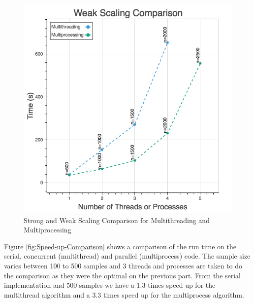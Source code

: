 \documentclass[10pt,twocolumn,letterpaper]{article}
\begin{document}
\begin{figure}[htbp]
\begin{center}
\includegraphics[scale=0.45]{figure/mt_mp_ws_comp.png}
\end{center}
\caption{\label{fig:Strong-and-Weak}Strong and Weak Scaling Comparison for
Multithreading and Multiprocessing}
\end{figure}


Figure \ref{fig:Speed-up-Comparison} shows a comparison of
the run time on the serial, concurrent (multithread) and parallel
(multiprocess) code. The sample size varies between 100 to 500 samples
and 3 threads and processes are taken to do the comparison as they
were the optimal on the previous part. From the serial implementation
and 500 samples we have a 1.3 times speed up for the multithread algorithm
and a 3.3 times speed up for the multiprocess algorithm.
\end{document}
